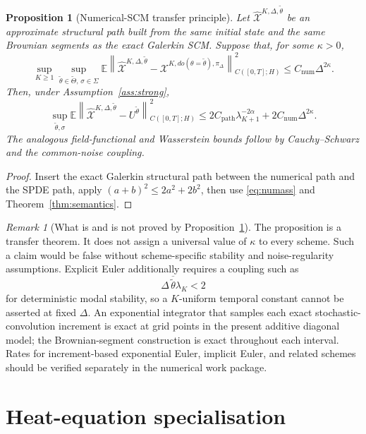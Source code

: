 \documentclass[11pt]{article}
\newtheorem{proposition}[assumption]{Proposition}
\theoremstyle{remark}
\newtheorem{remark}[assumption]{Remark}
\newcommand{\E}{\mathbb E}
\newcommand{\1}{\mathbf 1}
\newcommand{\cnorm}[1]{\left\lVert #1\right\rVert_{C([0,T];H)}}
\newcommand{\ThetaI}{\widetilde\Theta}
\newcommand{\thetamax}{\overline{\widetilde\theta}}
\begin{document}
\begin{proposition}[Numerical-SCM transfer principle]\label{prop:numerical}
Let \(\widehat{\mathcal X}^{K,\Delta,\widetilde\theta}\) be an approximate structural path built from the same initial state and the same Brownian segments as the exact Galerkin SCM.  Suppose that, for some \(\kappa>0\),
\begin{equation}\label{eq:numass}
 \sup_{K\ge1}\sup_{\widetilde\theta\in\ThetaI,\,\sigma\in\Sigma}
 \E\cnorm{
 \widehat{\mathcal X}^{K,\Delta,\widetilde\theta}
 -\mathcal X^{K,do(\theta=\widetilde\theta),\pi_\Delta}
 }^2
 \le C_{\mathrm{num}}\Delta^{2\kappa}.
\end{equation}
Then, under Assumption~\ref{ass:strong},
\begin{equation}\label{eq:totalnum}
 \sup_{\widetilde\theta,\sigma}
 \E\cnorm{
 \widehat{\mathcal X}^{K,\Delta,\widetilde\theta}
 -U^{\widetilde\theta}
 }^2
 \le
 2C_{\mathrm{path}}\lambda_{K+1}^{-2\alpha}
 +2C_{\mathrm{num}}\Delta^{2\kappa}.
\end{equation}
The analogous field-functional and Wasserstein bounds follow by Cauchy--Schwarz and the common-noise coupling.
\end{proposition}

\begin{proof}
Insert the exact Galerkin structural path between the numerical path and the SPDE path, apply \((a+b)^2\le2a^2+2b^2\), then use \eqref{eq:numass} and Theorem~\ref{thm:semantics}.
\end{proof}

\begin{remark}[What is and is not proved by Proposition~\ref{prop:numerical}]
The proposition is a transfer theorem.  It does not assign a universal value of \(\kappa\) to every scheme.  Such a claim would be false without scheme-specific stability and noise-regularity assumptions.  Explicit Euler additionally requires a coupling such as
\[
 \Delta\,\thetamax\lambda_K<2
\]
for deterministic modal stability, so a \(K\)-uniform temporal constant cannot be asserted at fixed \(\Delta\).  An exponential integrator that samples each exact stochastic-convolution increment is exact at grid points in the present additive diagonal model; the Brownian-segment construction is exact throughout each interval.  Rates for increment-based exponential Euler, implicit Euler, and related schemes should be verified separately in the numerical work package.
\end{remark}

\section{Heat-equation specialisation}
\end{document}
